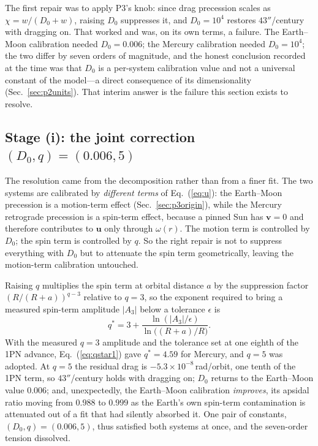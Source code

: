\documentclass[aps,reprint,amsmath,amssymb,nofootinbib,superscriptaddress,floatfix]{revtex4-2}
\begin{document}
The first repair was to apply P3's knob: since drag precession scales
as $\chi=w/(D_0+w)$, raising $D_0$ suppresses it, and $D_0=10^{4}$
restores $43''$/century with dragging on.
That worked and was, on its own terms, a failure.
The Earth--Moon calibration needed $D_0=0.006$; the Mercury
calibration needed $D_0=10^{4}$; the two differ by seven orders of
magnitude, and the honest conclusion recorded at the time was that
$D_0$ is a per-system calibration value and not a universal constant of
the model---a direct consequence of its dimensionality
(Sec.~\ref{sec:p2units}).
That interim answer is the failure this section exists to resolve.

\subsection{Stage (i): the joint correction
  \texorpdfstring{$(D_0,q)=(0.006,5)$}{(D0,q) = (0.006,5)}}
\label{sec:p4joint}

The resolution came from the decomposition rather than from a finer
fit.
The two systems are calibrated by \emph{different terms} of
Eq.~(\ref{eq:u}): the Earth--Moon precession is a motion-term effect
(Sec.~\ref{sec:p3origin}), while the Mercury retrograde precession is a
spin-term effect, because a pinned Sun has $\bm v=0$ and therefore
contributes to $\bm u$ only through $\omega(r)$.
The motion term is controlled by $D_0$; the spin term is controlled by
$q$.
So the right repair is not to suppress everything with $D_0$ but to
attenuate the spin term geometrically, leaving the motion-term
calibration untouched.

Raising $q$ multiplies the spin term at orbital distance $a$ by the
suppression factor $(R/(R+a))^{q-3}$ relative to $q=3$, so the exponent
required to bring a measured spin-term amplitude $|A_3|$ below a
tolerance $\epsilon$ is
\begin{equation}
  q^{*} = 3+\frac{\ln(|A_3|/\epsilon)}{\ln\bigl((R+a)/R\bigr)} .
  \label{eq:qstar1}
\end{equation}
With the measured $q=3$ amplitude and the tolerance set at one eighth
of the 1PN advance, Eq.~(\ref{eq:qstar1}) gave $q^{*}=4.59$ for
Mercury, and $q=5$ was adopted.
At $q=5$ the residual drag is $-5.3\times10^{-8}$\,rad/orbit, one tenth
of the 1PN term, so $43''$/century holds with dragging on;
$D_0$ returns to the Earth--Moon value $0.006$; and, unexpectedly, the
Earth--Moon calibration \emph{improves}, its apsidal ratio moving from
$0.988$ to $0.999$ as the Earth's own spin-term contamination is
attenuated out of a fit that had silently absorbed it.
One pair of constants, $(D_0,q)=(0.006,5)$, thus satisfied both systems
at once, and the seven-order tension dissolved.
\end{document}
